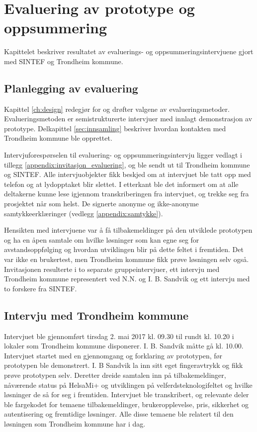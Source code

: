 \chapter{Evaluering av prototype og oppsummering}
\label{ch:evaluation1}
Kapittelet beskriver resultatet av evaluerings- og oppsummeringsintervjuene gjort med SINTEF og Trondheim kommune.

\section{Planlegging av evaluering}
Kapittel \ref{ch:design} redegjør for og drøfter valgene av evalueringsmetoder.
Evalueringsmetoden er semistrukturerte intervjuer med innlagt demonstrasjon av prototype. Delkapittel \ref{sec:innsamling}
beskriver hvordan kontakten med Trondheim kommune ble opprettet.

Intervjuforespørselen til evaluering- og oppsummeringsintervju ligger vedlagt i tillegg \ref{appendix:invitasjon_evaluering},
og ble sendt ut til Trondheim kommune og SINTEF. Alle intervjuobjekter fikk beskjed
om at intervjuet ble tatt opp med telefon og at lydopptaket blir slettet. I etterkant ble det informert om at alle deltakerne
kunne lese igjennom transkriberingen fra intervjuet, og trekke seg fra prosjektet når som helst. De signerte anonyme og ikke-anonyme
samtykkeerklæringer (vedlegg \ref{appendix:samtykke}).

Hensikten med intervjuene var å få tilbakemeldinger
på den utviklede prototypen og ha en åpen samtale om hvilke løsninger som kan egne seg for avstandsoppfølging og hvordan utviklingen blir
på dette feltet i fremtiden. Det var ikke en brukertest, men Trondheim kommune fikk prøve løsningen selv også.
Invitasjonen resulterte i to separate gruppeintervjuer, ett intervju med Trondheim kommune representert ved
N.N. og I. B. Sandvik og ett intervju med to forskere fra SINTEF.

\section{Intervju med Trondheim
kommune}\label{intervju-med-trondheim-kommune}
Intervjuet ble gjennomført tirsdag 2. mai 2017 kl. 09.30 til rundt kl. 10.20 i lokaler
som Trondheim kommune disponerer. I. B. Sandvik måtte gå kl. 10.00. Intervjuet startet med en gjennomgang og forklaring av prototypen, før prototypen
ble demonstrert. I. B Sandvik la inn sitt eget fingeravtrykk og fikk prøve prototypen selv. Deretter dreide samtalen inn på tilbakemeldinger,
nåværende status på HelsaMi+ og utviklingen på velferdsteknologifeltet og hvilke løsninger de så for seg i fremtiden. Intervjuet ble transkribert,
og relevante deler ble fargekodet for temaene tilbakemeldinger, brukeropplevelse, pris, sikkerhet og autentisering og fremtidige løsninger.
Alle disse temaene ble relatert til den løsningen som Trondheim kommune har i dag.

